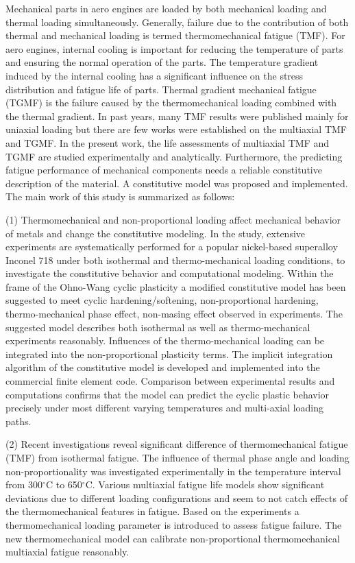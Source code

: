 \noindent
Mechanical parts in aero engines are loaded by both mechanical loading and thermal loading simultaneously. Generally, failure due to the contribution of both thermal and mechanical loading is termed thermomechanical fatigue (TMF). For aero engines, internal cooling is important for reducing the temperature of parts and ensuring the normal operation of the parts. The temperature gradient induced by the internal cooling has a significant influence on the stress distribution and fatigue life of parts. Thermal gradient mechanical fatigue (TGMF) is the failure caused by the thermomechanical loading combined with the thermal gradient. In past years, many TMF results were published mainly for uniaxial loading but there are few works were established on the multiaxial TMF and TGMF. In the present work, the life assessments of multiaxial TMF and TGMF are studied experimentally and analytically. Furthermore, the predicting fatigue performance of mechanical components needs a reliable constitutive description of the material. A constitutive model was proposed and implemented. The main work of this study is summarized as follows:

(1) Thermomechanical and non-proportional loading affect mechanical behavior of metals and change the constitutive modeling. In the study, extensive experiments are systematically performed for a popular nickel-based superalloy Inconel 718 under both isothermal and thermo-mechanical loading conditions, to investigate the constitutive behavior and computational modeling. Within the frame of the Ohno-Wang cyclic plasticity a modified constitutive model has been suggested to meet  cyclic hardening/softening, non-proportional hardening, thermo-mechanical phase effect, non-masing effect observed in experiments. The suggested model describes both isothermal as well as thermo-mechanical experiments reasonably. Influences of the thermo-mechanical loading can be integrated into the non-proportional plasticity terms. The implicit integration algorithm of the constitutive model is developed and implemented into the commercial finite element code. Comparison between  experimental results and computations confirms that the model can predict the cyclic plastic behavior precisely under most different varying temperatures and multi-axial loading paths.

(2) Recent investigations reveal significant difference of thermomechanical fatigue (TMF) from isothermal fatigue. The influence of thermal phase angle and loading non-proportionality was investigated experimentally in the temperature interval from 300$^\circ$C to 650$^\circ$C. Various multiaxial fatigue life models show significant deviations due to different loading configurations and seem to not catch effects of the thermomechanical features in fatigue. Based on the experiments a thermomechanical loading parameter is introduced to assess fatigue failure. The new thermomechanical model can calibrate non-proportional thermomechanical multiaxial fatigue reasonably.

